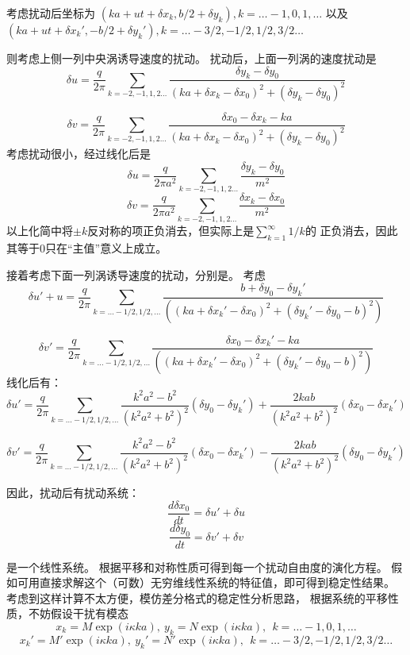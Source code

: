 \documentclass[UTF8,zihao=5]{ctexart} %
\begin{document}
考虑扰动后坐标为
$(ka + ut + \delta x_k, b/2 + \delta y_k), k = \dots -1, 0, 1, \dots$
以及
$(ka + ut + \delta x_k', -b/2 + \delta y_k'), k = \dots -3/2, -1/2, 1/2, 3/2\dots$

则考虑上侧一列中央涡诱导速度的扰动。
扰动后，上面一列涡的速度扰动是
$$
    \delta u = \frac{q}{2\pi}
    \sum_{k=-2,-1,1,2\dots}\frac{\delta y_k - \delta y_0}
    { (ka+\delta x_k-\delta x_0)^2 + (\delta y_k - \delta y_0)^2}
$$

$$
    \delta v = \frac{q}{2\pi}
    \sum_{k=-2,-1,1,2\dots}\frac{\delta x_0 - \delta x_k - ka}
    { (ka+\delta x_k-\delta x_0)^2 + (\delta y_k - \delta y_0)^2}
$$
考虑扰动很小，经过线化后是
$$
    \delta u = \frac{q}{2\pi a^2}
    \sum_{k=-2,-1,1,2\dots}\frac{\delta y_k-\delta y_0}{m^2}
$$
$$
    \delta v = \frac{q}{2\pi a^2}
    \sum_{k=-2,-1,1,2\dots}\frac{\delta x_k-\delta x_0}{m^2}
$$
以上化简中将$\pm k$反对称的项正负消去，但实际上是$\sum_{k=1}^{\infty}1/k$的
正负消去，因此其等于0只在“主值”意义上成立。

接着考虑下面一列涡诱导速度的扰动，分别是。
考虑
$$
    \delta u' + u = \frac{q}{2\pi}
    \sum_{k = \dots-1/2,1/2,\dots}
    {
        \frac{b+\delta y_0 - \delta  y_k'}{
            ((ka+\delta x_k'-\delta x_0)^2 + (\delta y_k' - \delta y_0 - b)^2)
        }
    }
$$

$$
    \delta v' = \frac{q}{2\pi}
    \sum_{k = \dots-1/2,1/2,\dots}
    {
        \frac{\delta x_0 - \delta x_k' - ka}{
            ((ka+\delta x_k'-\delta x_0)^2 + (\delta y_k' - \delta y_0 - b)^2)
        }
    }
$$
线化后有：
$$
    \delta u' = \frac{q}{2\pi}
    \sum_{k = \dots-1/2,1/2,\dots}
    {
        \frac{k^2a^2-b^2}{(k^2a^2+b^2)^2}(\delta y_0 - \delta y_k')
        +
        \frac{2kab}{(k^2a^2+b^2)^2}(\delta x_0 - \delta x_k')
    }
$$

$$
    \delta v' = \frac{q}{2\pi}
    \sum_{k = \dots-1/2,1/2,\dots}
    {
        \frac{k^2a^2-b^2}{(k^2a^2+b^2)^2}(\delta x_0 - \delta x_k')
        -
        \frac{2kab}{(k^2a^2+b^2)^2}(\delta y_0 - \delta y_k')
    }
$$

因此，扰动后有扰动系统：
$$
    \frac{d \delta x_0}{dt} = \delta u' + \delta u
$$
$$
    \frac{d \delta y_0}{dt} = \delta v' + \delta v
$$

是一个线性系统。
根据平移和对称性质可得到每一个扰动自由度的演化方程。
假如可用直接求解这个（可数）无穷维线性系统的特征值，即可得到稳定性结果。
考虑到这样计算不太方便，模仿差分格式的稳定性分析思路，
根据系统的平移性质，不妨假设干扰有模态
$$
    x_k=M\exp(i\kappa ka ),\ y_k=N\exp(i\kappa ka ),\ \ k = \dots -1, 0, 1, \dots
$$
$$
    x_k'=M'\exp(i\kappa ka ),\ y_k'=N'\exp(i\kappa ka ),\ \  k = \dots -3/2, -1/2, 1/2, 3/2\dots
$$
\end{document}
